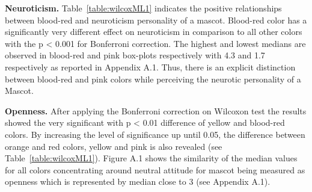 \par \textbf{Neuroticism.} Table~\ref{table:wilcoxML1} indicates the positive relationships between blood-red and neuroticism personality of a mascot. Blood-red color has a significantly very different effect on neuroticism in comparison to all other colors with the p < 0.001 for Bonferroni correction. The highest and lowest medians are observed in blood-red and pink box-plots respectively with 4.3 and 1.7 respectively as reported in Appendix A.1. Thus, there is an explicit distinction between blood-red and pink colors while perceiving the neurotic personality of a Mascot.
\par \textbf{Openness.} After applying the  Bonferroni correction on Wilcoxon test the results showed the very significant with p < 0.01 difference of yellow and blood-red colors. By increasing the level of significance up until 0.05, the difference between orange and red colors, yellow and pink is also revealed (see Table~\ref{table:wilcoxML1}). Figure A.1 shows the similarity of the median values for all colors concentrating around neutral attitude for mascot being measured as openness which is represented by median close to 3 (see Appendix A.1). 

